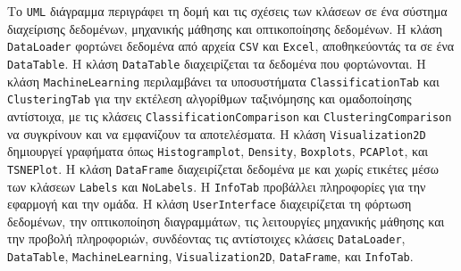 \documentclass[a4paper,12pt]{article}
\begin{document}
Το \texttt{UML} διάγραμμα περιγράφει τη δομή και τις σχέσεις των κλάσεων σε ένα σύστημα διαχείρισης δεδομένων, μηχανικής μάθησης και οπτικοποίησης δεδομένων. Η κλάση \texttt{DataLoader} φορτώνει δεδομένα από αρχεία \texttt{CSV} και \texttt{Excel}, αποθηκεύοντάς τα σε ένα \texttt{DataTable}. Η κλάση \texttt{DataTable} διαχειρίζεται τα δεδομένα που φορτώνονται. Η κλάση \texttt{MachineLearning} περιλαμβάνει τα υποσυστήματα \texttt{ClassificationTab} και \texttt{ClusteringTab} για την εκτέλεση αλγορίθμων ταξινόμησης και ομαδοποίησης αντίστοιχα, με τις κλάσεις \texttt{ClassificationComparison} και \texttt{ClusteringComparison} να συγκρίνουν και να εμφανίζουν τα αποτελέσματα. Η κλάση \texttt{Visualization2D} δημιουργεί γραφήματα όπως \texttt{Histogramplot}, \texttt{Density}, \texttt{Boxplots}, \texttt{PCAPlot}, και \texttt{TSNEPlot}. Η κλάση \texttt{DataFrame} διαχειρίζεται δεδομένα με και χωρίς ετικέτες μέσω των κλάσεων \texttt{Labels} και \texttt{NoLabels}. Η \texttt{InfoTab} προβάλλει πληροφορίες για την εφαρμογή και την ομάδα. Η κλάση \texttt{UserInterface} διαχειρίζεται τη φόρτωση δεδομένων, την οπτικοποίηση διαγραμμάτων, τις λειτουργίες μηχανικής μάθησης και την προβολή πληροφοριών, συνδέοντας τις αντίστοιχες κλάσεις \texttt{DataLoader}, \texttt{DataTable}, \texttt{MachineLearning}, \texttt{Visualization2D}, \texttt{DataFrame}, και \texttt{InfoTab}.
\end{document}
